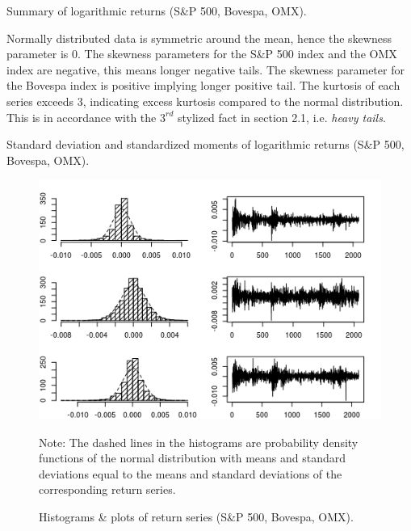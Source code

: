 \documentclass[12pt, letterpaper]{amsart}%
\begin{document}
\begin{table}%
\centering
\caption{Summary of logarithmic returns (S\&P 500, Bovespa, OMX).}
\end{table}

Normally distributed data is symmetric around the mean, hence the skewness parameter is 0. The skewness parameters for the S\&P 500 index and the OMX index are negative, this means longer negative tails. The skewness parameter for the Bovespa index is positive implying longer positive tail. The kurtosis of each series exceeds 3, indicating excess kurtosis compared to the normal distribution. This is in accordance with the $3^{rd}$ stylized fact in section 2.1, i.e. \textit{heavy tails}.

\begin{table}%
\centering
\caption{Standard deviation and standardized moments of logarithmic returns (S\&P 500, Bovespa, OMX).}
\end{table}

\begin{figure}%
\caption{Histograms \& plots of return series (S\&P 500, Bovespa, OMX).}
\centering
\includegraphics[scale=1]{data2.png}
	\begin{tablenotes}
	\small
	\item Note: The dashed lines in the histograms are probability density functions of the normal distribution with means and standard deviations equal to the means and standard deviations of the corresponding return series.
	\end{tablenotes}
\end{figure}
\end{document}
